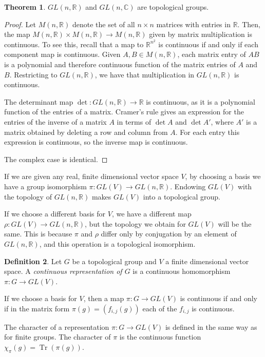 \documentclass[12pt, a4paper]{article}
\theoremstyle{definition}
\newtheorem{theorem}{Theorem}[section]
\newtheorem{definition}[theorem]{Definition}
\DeclareMathOperator{\Tr}{Tr}
\begin{document}
\begin{theorem}
$GL(n, \mathbb{R})$ and $GL(n, \mathbb{C})$ are topological groups.
\end{theorem}
\begin{proof}
Let $M(n, \mathbb{R})$ denote the set of all $n \times n$ matrices with entries in $\mathbb{R}$. Then, the map $M(n, \mathbb{R}) \times M(n, \mathbb{R}) \to M(n, \mathbb{R})$ given by matrix multiplication is continuous. To see this, recall that a map to $\mathbb{R}^{n^2}$ is continuous if and only if each component map is continuous. Given $A, B \in M(n, \mathbb{R})$, each matrix entry of $AB$ is a polynomial and therefore continuous function of the matrix entries of $A$ and $B$. Restricting to $GL(n, \mathbb{R})$, we have that multiplication in $GL(n, \mathbb{R})$ is continuous.

The determinant map $\det : GL(n, \mathbb{R}) \to \mathbb{R}$ is continuous, as it is a polynomial function of the entries of a matrix. Cramer's rule gives an expression for the entries of the inverse of a matrix $A$ in terms of $\det A$ and $\det A'$, where $A'$ is a matrix obtained by deleting a row and column from $A$. For each entry this expression is continuous, so the inverse map is continuous.

The complex case is identical.
\end{proof}

If we are given any real, finite dimensional vector space $V$, by choosing a basis we have a group isomorphism $\pi : GL(V) \to GL(n,\mathbb{R})$. Endowing $GL(V)$ with the topology of $GL(n,\mathbb{R})$ makes $GL(V)$ into a topological group.

If we choose a different basis for $V$, we have a different map $\rho : GL(V) \to GL(n,\mathbb{R})$, but the topology we obtain for $GL(V)$ will be the same. This is because $\pi$ and $\rho$ differ only by conjugation by an element of $GL(n,\mathbb{R})$, and this operation is a topological isomorphism.

\begin{definition}
Let $G$ be a topological group and $V$ a finite dimensional vector space. A \emph{continuous representation of $G$} is a continuous homomorphism $\pi : G \to GL(V)$.
\end{definition}

If we choose a basis for $V$, then a map $\pi : G \to GL(V)$ is continuous if and only if in the matrix form $\pi(g) = (f_{i, j}(g))$ each of the $f_{i, j}$ is continuous.

The character of a representation $\pi : G \to GL(V)$ is defined in the same way as for finite groups. The character of $\pi$ is the continuous function $\chi_\pi(g) = \Tr(\pi(g))$.
\end{document}
